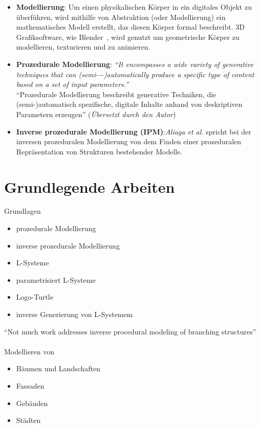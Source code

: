 \begin{itemize}
    \item \textbf{Modellierung}: Um einen physikalischen Körper in ein digitales Objekt zu überführen, wird mithilfe
    von Abstraktion (oder Modellierung) ein mathematisches Modell erstellt, das diesen Körper formal beschreibt.
    3D Grafiksoftware, wie Blender~\cite{blender}, wird genutzt um geometrische Körper zu modellieren, texturieren
    und zu animieren.
    \item \textbf{Prozedurale Modellierung}: \textit{"`It encompasses a wide variety of generative techniques that
    can (semi-−)automatically produce a specific type of content based on a set of input
    parameters."'} \\
    "`Prozedurale Modellierung beschreibt generative Techniken, die \\(semi-)automatisch spezifische, digitale
    Inhalte anhand von deskriptiven Parametern erzeugen"' (\textit{Übersetzt durch den Autor})
    \item \textbf{Inverse prozedurale Modellierung (IPM)}:\textit{Aliaga et al.}
    spricht bei der inversen prozeduralen Modellierung von dem Finden einer prozeduralen Repräsentation von
    Strukturen bestehender Modelle.
\end{itemize}

\section{Grundlegende Arbeiten}

Grundlagen
\begin{itemize}
    \item prozedurale Modellierung~\cite{smelik_2014}
    \item inverse prozedurale Modellierung~\cite{aliaga_2016}
    \item L-Systeme~\cite{lindemayer_1968}
    \item parametrisiert L-Systeme~\cite{prusinkiewicz_1993}
    \item Logo-Turtle~\cite{prusinkiewicz_1986}
    \item inverse Generierung von L-Systemem~\cite{higuera_2010}
\end{itemize}

"`Not much work addresses inverse procedural modeling of branching structures"'\\~\\

Modellieren von
\begin{itemize}
    \item Bäumen und Landschaften~\cite{deussen_2010}
    \item Fassaden~\cite{alhalawani_2013}
    \item Gebäuden~\cite{mueller_2006}
    \item Städten~\cite{parish_2001}
\end{itemize}


